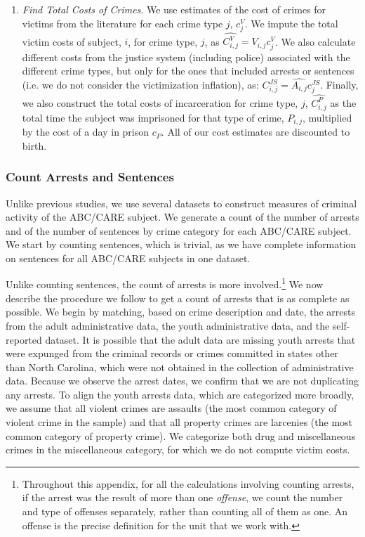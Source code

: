 \begin{enumerate}
\item \textit{Find Total Costs of Crimes}. We use estimates of the cost of crimes for victims from the literature for each crime type $j$, $c_j^V$. We impute the total victim costs of subject, $i$, for crime type, $j$, as $\widehat{C_{i,j}^V}=\widehat{V_{i,j}} c_j^V$. We also calculate different costs from the justice system (including police) associated with the different crime types, but only for the ones that included arrests or sentences (i.e. we do not consider the victimization inflation), as: $C_{i,j}^{JS}=\widehat{A_{i,j}} c_j^{JS}$. Finally, we also construct the total costs of incarceration for crime type, $j$, $\widehat{C_{i,j}^{P}}$ as the total time the subject was imprisoned for that type of crime, $P_{i,j}$, multiplied by the cost of a day in prison $c_P$. All of our cost estimates are discounted to birth.
\end{enumerate}


\subsubsection{Count Arrests and Sentences}
\noindent Unlike previous studies, we use several datasets to construct measures of criminal activity of the ABC/CARE subject. We generate a count of the number of arrests and of the number of sentences by crime category for each ABC/CARE subject. We start by counting sentences, which is trivial, as we have complete information on sentences for all ABC/CARE subjects in one dataset. 

\noindent Unlike counting sentences, the count of arrests is more involved.\footnote{Throughout this appendix, for all the calculations involving counting arrests, if the arrest was the result of more than one \textit{offense}, we count the number and type of offenses separately, rather than counting all of them as one. An offense is the precise definition for the unit that we work with.} We now describe the procedure we follow to get a count of arrests that is as complete as possible. We begin by matching, based on crime description and date, the arrests from the adult administrative data, the youth administrative data, and the self-reported dataset. It is possible that the adult data are missing youth arrests that were expunged from the criminal records or crimes committed in states other than North Carolina, which were not obtained in the collection of administrative data. Because we observe the arrest dates, we confirm that we are not duplicating any arrests. To align the youth arrests data, which are categorized more broadly, we assume that all violent crimes are assaults (the most common category of violent crime in the sample) and that all property crimes are larcenies (the most common category of property crime). We categorize both drug and miscellaneous crimes in the miscellaneous category, for which we do not compute victim costs. 

